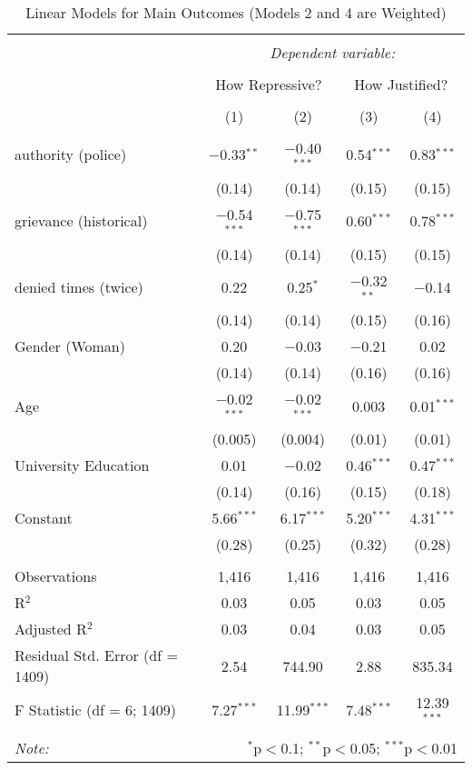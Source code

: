 
\begin{table}[!htbp] \centering 
  \caption{Linear Models for Main Outcomes (Models 2 and 4 are Weighted)} 
  \label{} 
\begin{tabular}{@{\extracolsep{5pt}}lcccc} 
\\[-1.8ex]\hline 
\hline \\[-1.8ex] 
 & \multicolumn{4}{c}{\textit{Dependent variable:}} \\ 
\cline{2-5} 
\\[-1.8ex] & \multicolumn{2}{c}{How Repressive?} & \multicolumn{2}{c}{How Justified?} \\ 
\\[-1.8ex] & (1) & (2) & (3) & (4)\\ 
\hline \\[-1.8ex] 
 authority (police) & $-$0.33$^{**}$ & $-$0.40$^{***}$ & 0.54$^{***}$ & 0.83$^{***}$ \\ 
  & (0.14) & (0.14) & (0.15) & (0.15) \\ 
  grievance (historical) & $-$0.54$^{***}$ & $-$0.75$^{***}$ & 0.60$^{***}$ & 0.78$^{***}$ \\ 
  & (0.14) & (0.14) & (0.15) & (0.15) \\ 
  denied times (twice) & 0.22 & 0.25$^{*}$ & $-$0.32$^{**}$ & $-$0.14 \\ 
  & (0.14) & (0.14) & (0.15) & (0.16) \\ 
  Gender (Woman) & 0.20 & $-$0.03 & $-$0.21 & 0.02 \\ 
  & (0.14) & (0.14) & (0.16) & (0.16) \\ 
  Age & $-$0.02$^{***}$ & $-$0.02$^{***}$ & 0.003 & 0.01$^{***}$ \\ 
  & (0.005) & (0.004) & (0.01) & (0.01) \\ 
  University Education & 0.01 & $-$0.02 & 0.46$^{***}$ & 0.47$^{***}$ \\ 
  & (0.14) & (0.16) & (0.15) & (0.18) \\ 
  Constant & 5.66$^{***}$ & 6.17$^{***}$ & 5.20$^{***}$ & 4.31$^{***}$ \\ 
  & (0.28) & (0.25) & (0.32) & (0.28) \\ 
 \hline \\[-1.8ex] 
Observations & 1,416 & 1,416 & 1,416 & 1,416 \\ 
R$^{2}$ & 0.03 & 0.05 & 0.03 & 0.05 \\ 
Adjusted R$^{2}$ & 0.03 & 0.04 & 0.03 & 0.05 \\ 
Residual Std. Error (df = 1409) & 2.54 & 744.90 & 2.88 & 835.34 \\ 
F Statistic (df = 6; 1409) & 7.27$^{***}$ & 11.99$^{***}$ & 7.48$^{***}$ & 12.39$^{***}$ \\ 
\hline 
\hline \\[-1.8ex] 
\textit{Note:}  & \multicolumn{4}{r}{$^{*}$p$<$0.1; $^{**}$p$<$0.05; $^{***}$p$<$0.01} \\ 
\end{tabular} 
\end{table} 
